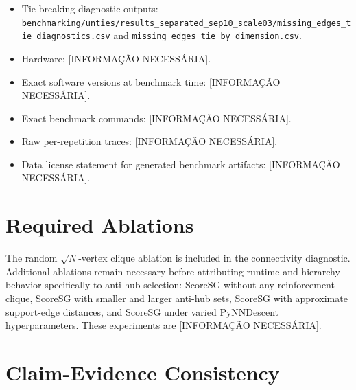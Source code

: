\documentclass[11pt]{article}
\begin{document}
\begin{itemize}[leftmargin=*]
  \item Tie-breaking diagnostic outputs: \texttt{benchmarking/unties/results\_separated\_sep10\_scale03/missing\_edges\_tie\_diagnostics.csv} and \texttt{missing\_edges\_tie\_by\_dimension.csv}.
  \item Hardware: [INFORMAÇÃO NECESSÁRIA].
  \item Exact software versions at benchmark time: [INFORMAÇÃO NECESSÁRIA].
  \item Exact benchmark commands: [INFORMAÇÃO NECESSÁRIA].
  \item Raw per-repetition traces: [INFORMAÇÃO NECESSÁRIA].
  \item Data license statement for generated benchmark artifacts: [INFORMAÇÃO NECESSÁRIA].
\end{itemize}

\section{Required Ablations}

The random \(\sqrt{N}\)-vertex clique ablation is included in the connectivity diagnostic. Additional ablations remain necessary before attributing runtime and hierarchy behavior specifically to anti-hub selection: ScoreSG without any reinforcement clique, ScoreSG with smaller and larger anti-hub sets, ScoreSG with approximate support-edge distances, and ScoreSG under varied PyNNDescent hyperparameters. These experiments are [INFORMAÇÃO NECESSÁRIA].

\section{Claim-Evidence Consistency}
\end{document}
